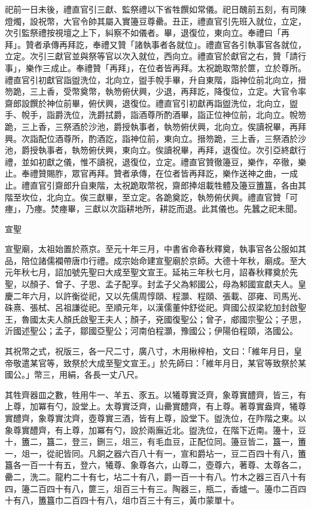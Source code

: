 \begin{pinyinscope}
 祀前一日未後，禮直官引三獻、監祭禮以下省牲饌如常儀。祀日醜前五刻，有司陳燈燭，設祝幣，大官令帥其屬入實籩豆尊罍。丑正，禮直官引先班入就位，立定，次引監祭禮按視壇之上下，糾察不如儀者。畢，退復位，東向立。奉禮曰「再拜」。贊者承傳再拜訖，奉禮又贊「諸執事者各就位」。禮直官各引執事官各就位，立定。次引三獻官並與祭等官以次入就位，西向立。禮直官於獻官之右，贊「請行事」，樂作三成止。奉禮贊「再拜」，在位者皆再拜。太祝跪取幣於篚，立於尊所。禮直官引初獻官詣盥洗位，北向立，盥手帨手畢，升自東階，詣神位前北向立，搢笏跪，三上香，受幣奠幣，執笏俯伏興，少退，再拜訖，降復位，立定。大官令率齋郎設饌於神位前畢，俯伏興，退復位。禮直官引初獻再詣盥洗位，北向立，盥手、帨手，詣爵洗位，洗爵拭爵，詣酒尊所酌酒畢，詣正位神位前，北向立。帨笏跪，三上香，三祭酒於沙池，爵授執事者，執笏俯伏興，北向立。俟讀祝畢，再拜興。次詣配位酒尊所，酌酒訖，詣神位前，東向立。搢笏跪，三上香，三祭酒於沙池，爵授執事者，執笏俯伏興，東向立。俟讀祝畢，再拜，退復位。次引亞終獻行禮，並如初獻之儀，惟不讀祝，退復位，立定。禮直官贊徹籩豆，樂作，卒徹，樂止。奉禮贊賜胙，眾官再拜。贊者承傳，在位者皆再拜訖，樂作送神之曲，一成止。禮直官引齋郎升自東階，太祝跪取幣祝，齋郎捧俎載牲體及籩豆簠簋，各由其階至坎位，北向立。俟三獻畢，至立定。各跪奠訖，執笏俯伏興。禮直官贊「可瘞」，乃瘞。焚瘞畢，三獻以次詣耕地所，耕訖而退。此其儀也。先蠶之祀未聞。



 宣聖



 宣聖廟，太祖始置於燕京。至元十年三月，中書省命春秋釋奠，執事官各公服如其品，陪位諸儒襴帶唐巾行禮。成宗始命建宣聖廟於京師。大德十年秋，廟成。至大元年秋七月，詔加號先聖曰大成至聖文宣王。延祐三年秋七月，詔春秋釋奠於先聖，以顏子、曾子、子思、孟子配享。封孟子父為邾國公，母為邾國宣獻夫人。皇慶二年六月，以許衡從祀，又以先儒周惇頤、程灝、程頤、張載、邵雍、司馬光、硃熹、張栻、呂祖謙從祀。至順元年，以漢儒董仲舒從祀。齊國公叔梁紇加封啟聖王，魯國太夫人顏氏啟聖王夫人；顏子，兗國復聖公；曾子，郕國宗聖公；子思，沂國述聖公；孟子，鄒國亞聖公；河南伯程灝，豫國公；伊陽伯程頤，洛國公。



 其祝幣之式，祝版三，各一尺二寸，廣八寸，木用楸梓柏，文曰：「維年月日，皇帝敬遣某官等，致祭於大成至聖文宣王。」於先師曰：「維年月日，某官等致祭於某國公。」幣三，用絹，各長一丈八尺。



 其牲齊器皿之數，牲用牛一、羊五、豕五。以犧尊實泛齊，象尊實醴齊，皆三，有上尊，加冪有勺，設堂上。太尊實泛齊，山罍實醴齊，有上尊。著尊實盎齊，犧尊實醴齊，象尊實沈齊，壺尊實三酒，皆有上尊，設堂下。盥洗位，在阼階之東。以象尊實醴齊，有上尊，加冪有勺，設於兩廡近北。盥洗位，在階下近南。籩十，豆十，簠二，簋二，登三，鉶三，俎三，有毛血豆，正配位同。籩豆皆二，簋一，簠一，俎一，從祀皆同。凡銅之器六百八十有一，宣和爵坫一，豆二百四十有八，簠簋各一百一十有五，登六，犧尊、象尊各六，山尊二，壺尊六，著尊、太尊各二，罍二，洗二。龍杓二十有七，坫二十有八，爵一百一十有八。竹木之器三百八十有四，籩二百四十有八，篚三，俎百三十有三。陶器三，瓶二，香爐一。籩巾二百四十有八，簠簋巾二百四十有八，俎巾百三十有三，黃巾蒙單十。




\end{pinyinscope}
